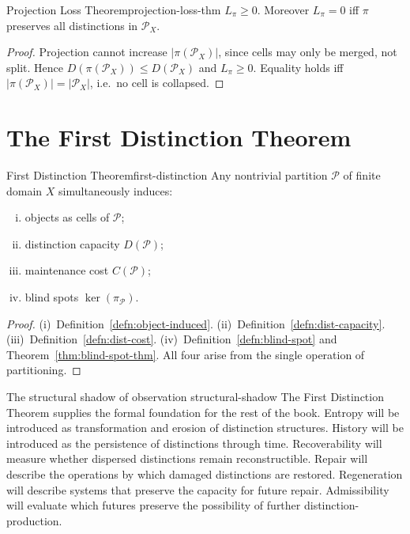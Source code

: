 \documentclass[12pt,twoside,openright]{book}
\newcommand{\partition}{\mathcal{P}}
\begin{document}
\begin{theorem}{Projection Loss Theorem}{projection-loss-thm}
  $L_\pi \ge 0$. Moreover $L_\pi = 0$ iff $\pi$
  preserves all distinctions in $\partition_X$.
\end{theorem}

\begin{proof}
  Projection cannot increase $|\pi(\partition_X)|$, since
  cells may only be merged, not split. Hence
  $D(\pi(\partition_X)) \le D(\partition_X)$ and
  $L_\pi \ge 0$. Equality holds iff $|\pi(\partition_X)|
  = |\partition_X|$, i.e.\ no cell is collapsed.
\end{proof}

\section{The First Distinction Theorem}
\label{sec:ch1-fdt}

\begin{theorem}{First Distinction Theorem}{first-distinction}
  Any nontrivial partition $\partition$ of finite domain
  $X$ simultaneously induces:
  \begin{enumerate}[(i)]
    \item objects as cells of $\partition$;
    \item distinction capacity $D(\partition)$;
    \item maintenance cost $C(\partition)$;
    \item blind spots $\ker(\pi_\partition)$.
  \end{enumerate}
\end{theorem}

\begin{proof}
  (i)~Definition~\ref{defn:object-induced}.
  (ii)~Definition~\ref{defn:dist-capacity}.
  (iii)~Definition~\ref{defn:dist-cost}.
  (iv)~Definition~\ref{defn:blind-spot}
  and Theorem~\ref{thm:blind-spot-thm}.
  All four arise from the single operation of partitioning.
\end{proof}

\begin{remark}{The structural shadow of observation}%
  {structural-shadow}
  The First Distinction Theorem supplies the formal
  foundation for the rest of the book. Entropy will be
  introduced as transformation and erosion of distinction
  structures. History will be introduced as the persistence
  of distinctions through time. Recoverability will measure
  whether dispersed distinctions remain reconstructible.
  Repair will describe the operations by which damaged
  distinctions are restored. Regeneration will describe
  systems that preserve the capacity for future repair.
  Admissibility will evaluate which futures preserve the
  possibility of further distinction-production.
\end{remark}
\end{document}
